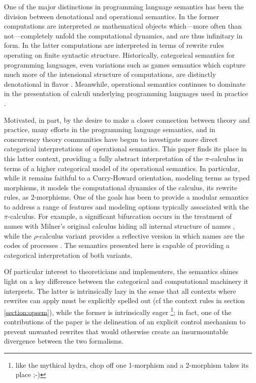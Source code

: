 \documentclass[]{acm_proc_article-sp}
\numberwithin{equation}{subsection}
\newcommand{\pic}{$\pi$-calculus}
\begin{document}
One of the major distinctions in programming language semantics has
been the division between denotational and operational semantics. In
the former computations are interpreted as mathematical objects
which---more often than not---completely unfold the computational
dynamics, and are thus infinitary in form. In the latter computations
are interpreted in terms of rewrite rules operating on finite
syntactic structure. Historically, categorical semantics for
programming languages, even variations such as games semantics
\cite{DBLP:conf/lics/McCusker96} which capture much more of the
intensional structure of computations, are distinctly denotational in
flavor \cite{DBLP:journals/iandc/Moggi91}. Meanwhile, operational
semantics continues to dominate in the presentation of calculi
underlying programming languages used in practice
\cite{DBLP:conf/aplas/MaffeisMT08}
\cite{DBLP:conf/oopsla/IgarashiPW99}
\cite{Politz:2013:PFM:2509136.2509536}.

Motivated, in part, by the desire to make a closer connection between
theory and practice, many efforts in the programming language
semantics, and in concurrency theory communities have begun to
investigate more direct categorical interpretations of operational
semantics. This paper finds its place in this latter context,
providing a fully abstract interpretation of the {\pic} in terms of a
higher categorical model of its operational semantics. In particular,
while it remains faithful to a Curry-Howard orientation, modeling
terms as typed morphisms, it models the computational dynamics of the
calculus, its rewrite rules, as 2-morphisms. One of the goals has been
to provide a modular semantics to address a range of features and
modeling options typically associated with the {\pic}. For example, a
significant bifurcation occurs in the treatment of names with Milner's
original calculus hiding all internal structure of names
\cite{milner91polyadicpi}, while the $\rho$-calculus variant provides
a reflective version in which names are the codes of processes
\cite{DBLP:journals/entcs/MeredithR05}. The semantics presented here
is capable of providing a categorical interpretation of both variants.

Of particular interest to theoreticians and implementers, the
semantics shines light on a key difference between the categorical and
computational machinery it interprets. The latter is intrinsically
lazy in the sense that all contexts where rewrites can apply must be
explicitly spelled out (cf the context rules in section
\ref{section:opsem}), while the former is intrinsically eager \footnote{like the mythical hydra, chop off one 1-morphism and a 2-morphism takes its place ;-)}; in
fact, one of the contributions of the paper is the delineation of an
explicit control mechanism to prevent unwanted rewrites that would
otherwise create an insurmountable divergence between the two
formalisms. 
\end{document}
